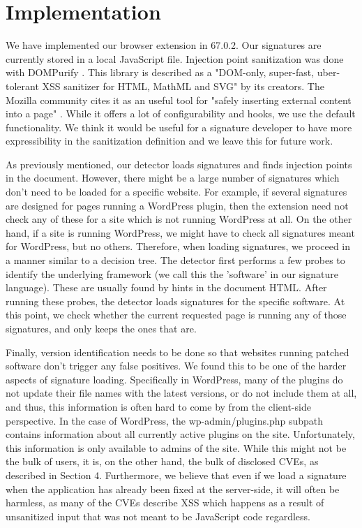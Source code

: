 \section{Implementation}

We have implemented our browser extension in 67.0.2. Our signatures are currently stored in a local JavaScript file. Injection point sanitization was done with DOMPurify \cite{10.1007/978-3-319-66399-9_7}. This library is described as a "DOM-only, super-fast, uber-tolerant XSS sanitizer for HTML, MathML and SVG" by its creators. The Mozilla community cites it as an useful tool for "safely inserting external content into a page" \cite{safecontent}. While it offers a lot of configurability and hooks, we use the default functionality. We think it would be useful for a signature developer to have more expressibility in the sanitization definition and we leave this for future work. 

As previously mentioned, our detector loads signatures and finds injection points in the document. However, there might be a large number of signatures which don't need to be loaded for a specific website. For example, if several signatures are designed for pages running a WordPress plugin, then the extension need not check any of these for a site which is not running WordPress at all. On the other hand, if a site is running WordPress, we might have to check all signatures meant for WordPress, but no others. Therefore, when loading signatures, we proceed in a manner similar to a decision tree. The detector first performs a few probes to identify the underlying framework (we call this the 'software' in our signature language). These are usually found by hints in the document HTML. After running these probes, the detector loads signatures for the specific software. At this point, we check whether the current requested page is running any of those signatures, and only keeps the ones that are. 

Finally, version identification needs to be done so that websites running patched software don't trigger any false positives. We found this to be one of the harder aspects of signature loading. Specifically in WordPress, many of the plugins do not update their file names with the latest versions, or do not include them at all, and thus, this information is often hard to come by from the client-side perspective. In the case of WordPress, the wp-admin/plugins.php subpath contains information about all currently active plugins on the site. Unfortunately, this information is only available to admins of the site. While this might not be the bulk of users, it is, on the other hand, the bulk of disclosed CVEs, as described in Section 4. Furthermore, we believe that even if we load a signature when the application has already been fixed at the server-side, it will often be harmless, as many of the CVEs describe XSS which happens as a result of unsanitized input that was not meant to be JavaScript code regardless.

